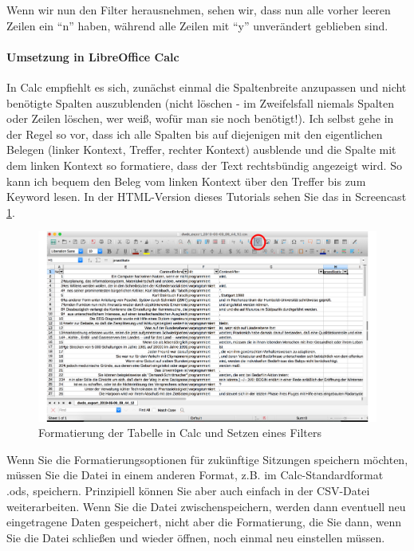 \documentclass[]{article}
\let\oldparagraph\paragraph
\renewcommand{\paragraph}[1]{\oldparagraph{#1}\mbox{}}
\begin{document}
Wenn wir nun den Filter herausnehmen, sehen wir, dass nun alle vorher
leeren Zeilen ein ``n'' haben, während alle Zeilen mit ``y'' unverändert
geblieben sind.

\hypertarget{umsetzung-in-libreoffice-calc}{\paragraph{Umsetzung in
LibreOffice Calc}\label{umsetzung-in-libreoffice-calc}}

In Calc empfiehlt es sich, zunächst einmal die Spaltenbreite anzupassen
und nicht benötigte Spalten auszublenden (nicht löschen - im
Zweifelsfall niemals Spalten oder Zeilen löschen, wer weiß, wofür man
sie noch benötigt!). Ich selbst gehe in der Regel so vor, dass ich alle
Spalten bis auf diejenigen mit den eigentlichen Belegen (linker Kontext,
Treffer, rechter Kontext) ausblende und die Spalte mit dem linken
Kontext so formatiere, dass der Text rechtsbündig angezeigt wird. So
kann ich bequem den Beleg vom linken Kontext über den Treffer bis zum
Keyword lesen. In der HTML-Version dieses Tutorials sehen Sie das in
Screencast \ref{fig:calcformat}.

\begin{figure}
\includegraphics[width=6.66in]{fig/calcformat} \caption{Formatierung der Tabelle in Calc und Setzen eines Filters}\label{fig:calcformat}
\end{figure}

Wenn Sie die Formatierungsoptionen für zukünftige Sitzungen speichern
möchten, müssen Sie die Datei in einem anderen Format, z.B. im
Calc-Standardformat .ods, speichern. Prinzipiell können Sie aber auch
einfach in der CSV-Datei weiterarbeiten. Wenn Sie die Datei
zwischenspeichern, werden dann eventuell neu eingetragene Daten
gespeichert, nicht aber die Formatierung, die Sie dann, wenn Sie die
Datei schließen und wieder öffnen, noch einmal neu einstellen müssen.
\end{document}
